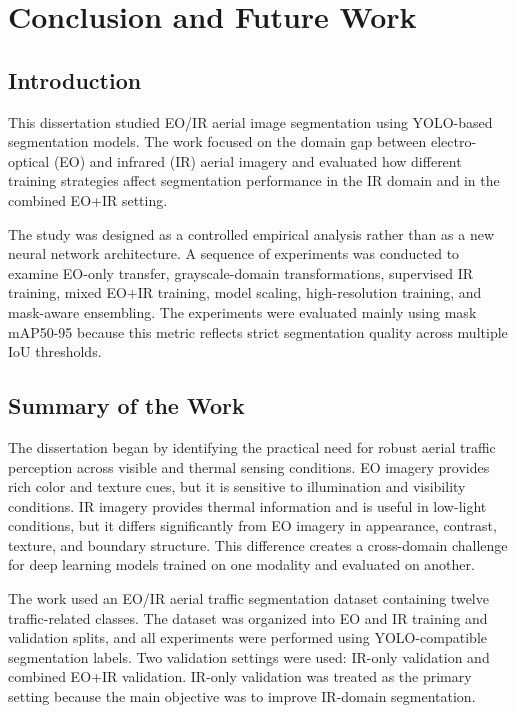 \chapter{Conclusion and Future Work}

\section{Introduction}

This dissertation studied EO/IR aerial image segmentation using YOLO-based segmentation models. The work focused on the domain gap between electro-optical (EO) and infrared (IR) aerial imagery and evaluated how different training strategies affect segmentation performance in the IR domain and in the combined EO+IR setting.

The study was designed as a controlled empirical analysis rather than as a new neural network architecture. A sequence of experiments was conducted to examine EO-only transfer, grayscale-domain transformations, supervised IR training, mixed EO+IR training, model scaling, high-resolution training, and mask-aware ensembling. The experiments were evaluated mainly using mask mAP50-95 because this metric reflects strict segmentation quality across multiple IoU thresholds.

\section{Summary of the Work}

The dissertation began by identifying the practical need for robust aerial traffic perception across visible and thermal sensing conditions. EO imagery provides rich color and texture cues, but it is sensitive to illumination and visibility conditions. IR imagery provides thermal information and is useful in low-light conditions, but it differs significantly from EO imagery in appearance, contrast, texture, and boundary structure. This difference creates a cross-domain challenge for deep learning models trained on one modality and evaluated on another.

The work used an EO/IR aerial traffic segmentation dataset containing twelve traffic-related classes. The dataset was organized into EO and IR training and validation splits, and all experiments were performed using YOLO-compatible segmentation labels. Two validation settings were used: IR-only validation and combined EO+IR validation. IR-only validation was treated as the primary setting because the main objective was to improve IR-domain segmentation.

